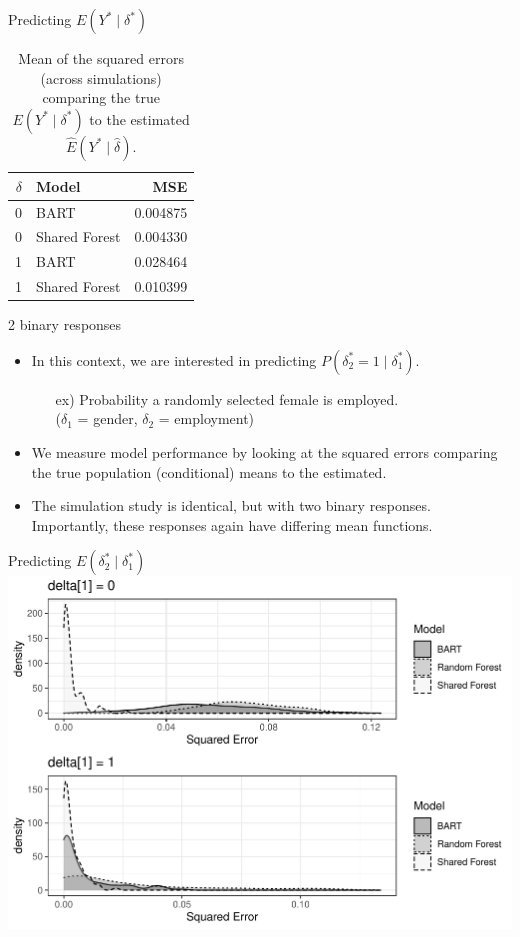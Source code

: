 \documentclass{beamer}
\begin{document}
\begin{frame}{Predicting $E(Y^* \mid \delta^*)$ }

\begin{table}[ht]
\centering
\begin{tabular}{rlr}
  \hline
$\delta$ & Model & MSE\\
  \hline
0 & BART & 0.004875  \\ 
  0 & Shared Forest & 0.004330  \\ 
  1 & BART & 0.028464  \\ 
  1 & Shared Forest & 0.010399  \\ 
   \hline
\end{tabular}
\caption{\label{tab:mse} Mean of the squared errors (across simulations) comparing the true $E(Y^* \mid \delta^*)$ to the estimated $\hat{E}(Y^* \mid \hat{\delta})$.}
\end{table}

\end{frame}




\begin{frame}{2 binary responses}
\begin{itemize}
\item In this context, we are interested in predicting $P(\delta^*_2=1 \mid \delta^*_1)$.
\begin{itemize}
\item[ex)] Probability a randomly selected female is employed. \\($\delta_1$ = gender, $\delta_2$ = employment)
\end{itemize}
\item We measure model performance by looking at the squared errors comparing the true population (conditional) means to the estimated. 

\item The simulation study is identical, but with two binary responses. Importantly, these responses again have differing mean functions. 
\end{itemize}
\end{frame}

\begin{frame}{Predicting $E(\delta_2^* \mid \delta_1^*)$ }
\includegraphics[width = .9\linewidth]{binary_sim_results.pdf}
\end{frame}
\end{document}
